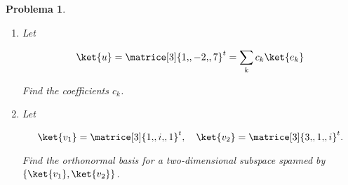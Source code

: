 \documentclass[12pt]{article}
\theoremstyle{break}
\newtheorem{exercise}{Problema}
\theoremstyle{nonumberbreak}
\begin{document}
\begin{exercise}
\begin{enumerate}[label = (\alph*)]
\begin{enumerate}[label = \arabic*.]
                \item Let
                
                \begin{equation*}
                    \ket{u} = \matrice[3]{1{,}, -2{,}, 7}^{t} =
                    \sum_{k} c_{k}\ket{e_{k}}
                \end{equation*}

                Find the coefficients \(c_{k}\).

                \item Let
                
                \begin{equation*}
                    \ket{v_{1}} = \matrice[3]{1{,}, i{,}, 1}^{t},
                    \quad
                    \ket{v_{2}} = \matrice[3]{3{,}, 1{,}, i}^{t}.
                \end{equation*}

                Find the orthonormal basis for a two-dimensional subspace spanned by \(\left\lbrace\ket{v_{1}}, \ket{v_{2}}\right\rbrace\).
            \end{enumerate}
        \end{enumerate}
    \end{exercise}
\end{document}
